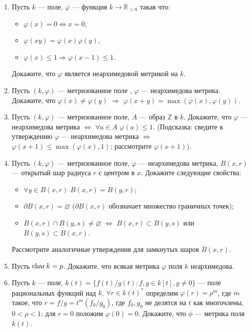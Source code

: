 \begin{enumerate}[topsep=0pt]
    \item Пусть $k$ --- поле, $\varphi$ --- функция $k \rightarrow \mathbb{R}_{>0}$ такая что:
    \begin{itemize}[topsep=0pt]
        \item $\varphi(x) = 0 \Leftrightarrow x=0$,
        \item $\varphi(xy) = \varphi(x)\varphi(y)$,
        \item $\varphi(x) \leqslant 1 \Rightarrow \varphi(x-1) \leqslant 1$.
    \end{itemize}
    Докажите, что $\varphi$ является неархимедовой метрикой на $k$.

    \item Пусть $(k,\varphi)$ --- метризованное поле , $\varphi$ --- неархимедова метрика. Докажите, что $\varphi(x) \neq \varphi(y)$ $\Rightarrow$ $\varphi(x+y) = \max(\varphi(x),\varphi(y))$.

    \item Пусть $(k,\varphi)$ --- метризованное поле, $A$ --- образ $\mathbb{Z}$ в $k$. Докажите, что $\varphi$ --- неархимедова метрика $\Leftrightarrow$ $\forall a \in A$ $\varphi(a) \leqslant 1$. (Подсказка: сведите к утверждению $\varphi$ --- неархимедова метрика $\Leftrightarrow$ $\varphi(x+1) \leqslant \max(\varphi(x),1)$; рассмотрите $\varphi(x+1)$).

    \item Пусть $(k,\varphi)$ --- метризованное поле, $\varphi$ --- неархимедова метрика, $B(x,r)$ --- открытый шар радиуса $r$ с центром в $x$. Докажите следующие свойства:
    \begin{itemize}[topsep=0pt]
        \item $\forall y \in B(x,r)$ $B(x,r)=B(y,r)$;
        \item $\partial B(x,r) = \varnothing$ ($\partial B(x,r)$ обозначает множество граничных точек);
        \item $B(x,r) \cap B(y,s) \neq \varnothing$ $\Leftrightarrow$ $B(x,r) \subset B(y,s)$ или $B(y,s) \subset B(x,r)$.
    \end{itemize}
    Рассмотрите аналогичные утверждения для замкнутых шаров $\bar B(x,r)$.

    \item Пусть $\operatorname{char} k = p$. Докажите, что всякая метрика $\varphi$ поля $k$ неархимедова.

    \item Пусть $k$ --- поле, $k(t)=\{f(t)/g(t): f,g \in k[t], g \neq 0\}$ --- поле рациональных функций над $k$. $\forall r \in k(t)^*$ определим $\varphi(r)=\rho^m$, где $m$ такое, что $r=f/g=t^m(f_0/g_0)$, где $f_0, g_0$ не делятся на $t$ как многочлены, $0 < \rho < 1$; для $r=0$ положим $\varphi(0)=0$. Докажите, что $\phi$ --- метрика поля $k(t)$.


\end{enumerate}
